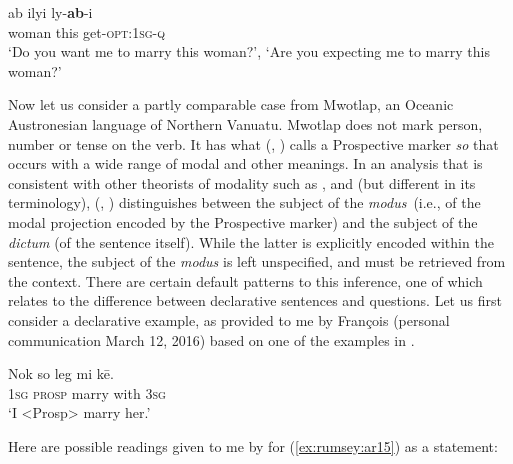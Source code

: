 \documentclass[output=paper]{langsci/langscibook}
\begin{document}
\begin{exe}
	\ex \label{ex:rumsey:ar14}
	\gll ab ilyi ly-\textbf{ab}-i\\
	woman this get-\textsc{opt}:1\textsc{sg}-\textsc{q}\\
	\trans ‘Do you want me to marry this woman?’, ‘Are you expecting me to marry this woman?’
\end{exe}

Now let us consider a partly comparable case from Mwotlap, an Oceanic Austronesian language of Northern Vanuatu. Mwotlap does not mark person, number or tense on the verb. It has what \citeauthor{Francois2003} (\citeyear{Francois2003}, \citeyear{Francois2004}) calls a Prospective marker \textit{so} that occurs with a wide range of modal and other meanings.  In an analysis that is consistent with other theorists of modality such as \cite{Halliday1970}, \cite{Verstraete2005} and \cite{Lehmann2012} (but different in its terminology), \citeauthor{Francois2003} (\citeyear{Francois2003}, \citeyear{Francois2004}) distinguishes between the subject of the \textit{modus} (i.e., of the modal projection encoded by the Prospective marker) and the subject of the \textit{dictum} (of the sentence itself). While the latter is explicitly encoded within the sentence, the subject of the \textit{modus} is left unspecified, and must be retrieved from the context. There are certain default patterns to this inference, one of which relates to the difference between declarative sentences and questions. Let us first consider a declarative example, as provided to me by François (personal communication March 12, 2016) based on one of the examples in \cite[221]{Francois2003}.

\begin{exe}
	\ex \label{ex:rumsey:ar15}
	\gll Nok so leg mi kē.\\
	1\textsc{sg} \textsc{prosp} marry with 3\textsc{sg}\\
	\trans ‘I <Prosp> marry her.’
\end{exe}

Here are possible readings given to me by \citeauthor{Francois2003} for (\ref{ex:rumsey:ar15}) as a statement:
\end{document}
